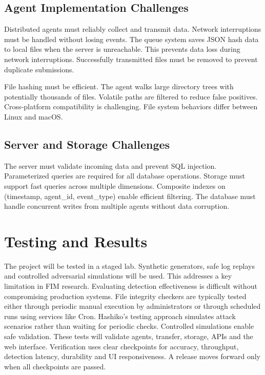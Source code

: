 \documentclass[conference]{IEEEtran}
\begin{document}
\subsection{Agent Implementation Challenges}

Distributed agents must reliably collect and transmit data. Network interruptions must be handled without losing events. The queue system saves JSON hash data to local files when the server is unreachable. This prevents data loss during network interruptions. Successfully transmitted files must be removed to prevent duplicate submissions.

File hashing must be efficient. The agent walks large directory trees with potentially thousands of files. Volatile paths are filtered to reduce false positives. Cross-platform compatibility is challenging. File system behaviors differ between Linux and macOS.

\subsection{Server and Storage Challenges}

The server must validate incoming data and prevent SQL injection. Parameterized queries are required for all database operations. Storage must support fast queries across multiple dimensions. Composite indexes on (timestamp, agent\_id, event\_type) enable efficient filtering. The database must handle concurrent writes from multiple agents without data corruption.

\section{Testing and Results}

The project will be tested in a staged lab. Synthetic generators, safe log replays and controlled adversarial simulations will be used. This addresses a key limitation in FIM research. Evaluating detection effectiveness is difficult without compromising production systems. File integrity checkers are typically tested either through periodic manual execution by administrators or through scheduled runs using services like Cron. Hashiko's testing approach simulates attack scenarios rather than waiting for periodic checks. Controlled simulations enable safe validation. These tests will validate agents, transfer, storage, APIs and the web interface. Verification uses clear checkpoints for accuracy, throughput, detection latency, durability and UI responsiveness. A release moves forward only when all checkpoints are passed.
\end{document}

